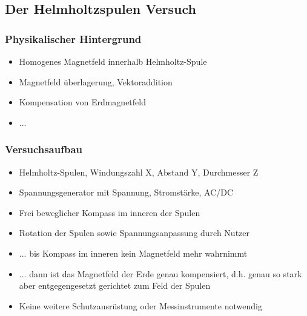 \subsection{Der Helmholtzspulen Versuch}

\subsubsection{Physikalischer Hintergrund}
\begin{itemize}
	\item Homogenes Magnetfeld innerhalb Helmholtz-Spule
	\item Magnetfeld überlagerung, Vektoraddition
	\item Kompensation von Erdmagnetfeld
	\item ...
\end{itemize}

\subsubsection{Versuchsaufbau}
\begin{itemize}
	\item Helmholtz-Spulen, Windungszahl X, Abstand Y, Durchmesser Z
	\item Spannungsgenerator mit Spannung, Stromstärke, AC/DC
	\item Frei beweglicher Kompass im inneren der Spulen
	\item Rotation der Spulen sowie Spannungsanpassung durch Nutzer
	\item ... bis Kompass im inneren kein Magnetfeld mehr wahrnimmt
	\item ... dann ist das Magnetfeld der Erde genau kompensiert, d.h. genau so stark aber entgegengesetzt gerichtet zum Feld der Spulen
	\item Keine weitere Schutzausrüstung oder Messinstrumente notwendig
\end{itemize}